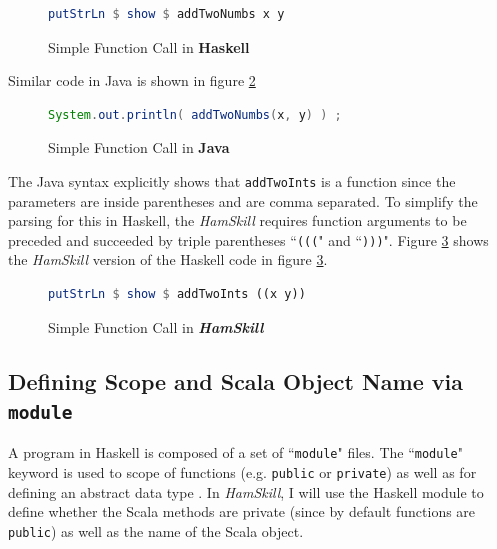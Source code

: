 \documentclass{report}
\begin{document}
\begin{figure}[H]
\begin{mdframed}
\begin{lstlisting}[language=Haskell]
putStrLn $ show $ addTwoNumbs x y
\end{lstlisting}
\end{mdframed}
\caption{Simple Function Call in \textbf{Haskell}}\label{fig:addTwoNumbersHaskell}
\end{figure}

Similar code in Java is shown in figure \ref{fig:addTwoNumbersJava}

\begin{figure}[H]
\begin{mdframed}
\begin{lstlisting}[language=Java]
System.out.println( addTwoNumbs(x, y) ) ;
\end{lstlisting}
\end{mdframed}
\caption{Simple Function Call in \textbf{Java}}\label{fig:addTwoNumbersJava}
\end{figure}

The Java syntax explicitly shows that {\tt addTwoInts} is a function since the parameters are inside parentheses and are comma separated.  To simplify the parsing for this in Haskell, the \emph{HamSkill} requires function arguments to be preceded and succeeded by triple parentheses ``\texttt{(((}" and ``\texttt{)))}".  Figure \ref{fig:addTwoNumbersHamSkill} shows the \emph{HamSkill} version of the Haskell code in figure \ref{fig:addTwoNumbersHamSkill}.

\begin{figure}[H]
\begin{mdframed}
\begin{lstlisting}[language=Haskell]
putStrLn $ show $ addTwoInts ((x y))
\end{lstlisting}
\end{mdframed}
\caption{Simple Function Call in \textbf{\emph{HamSkill}}}\label{fig:addTwoNumbersHamSkill}
\end{figure}

\subsection{Defining Scope and Scala Object Name via {\tt module}}

A program in Haskell is composed of a set of ``{\tt module}" files.  The ``{\tt module}" keyword is used to  scope of functions (e.g. {\tt public} or {\tt private}) as well as for defining an abstract data type \cite{haskellModule}.  In \emph{HamSkill}, I will use the Haskell module to define whether the Scala methods are private (since by default functions are {\tt public}) as well as the name of the Scala object.
\end{document}
